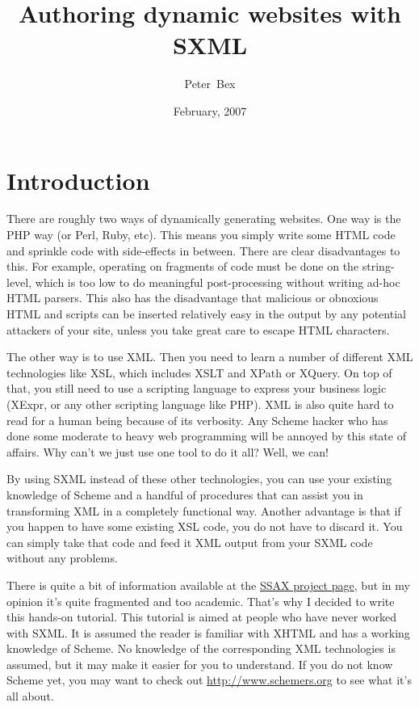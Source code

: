 \documentclass{article}
\date{February, 2007}
\title{Authoring dynamic websites with SXML}
\author{Peter~Bex}
\begin{document}
\maketitle

\section{Introduction}

There are roughly two ways of dynamically generating websites.  One
way is the PHP way (or Perl, Ruby, etc).  This means you simply write
some HTML code and sprinkle code with side-effects in between.  There
are clear disadvantages to this.  For example, operating on fragments
of code must be done on the string-level, which is too low to do
meaningful post-processing without writing ad-hoc HTML parsers.  This
also has the disadvantage that malicious or obnoxious HTML and scripts
can be inserted relatively easy in the output by any potential
attackers of your site, unless you take great care to escape HTML
characters.

The other way is to use XML.  Then you need to learn a number of
different XML technologies like XSL, which includes XSLT and XPath or
XQuery.  On top of that, you still need to use a scripting language to
express your business logic (XExpr, or any other scripting language
like PHP).  XML is also quite hard to read for a human being because
of its verbosity.  Any Scheme hacker who has done some moderate to
heavy web programming will be annoyed by this state of affairs.  Why
can't we just use one tool to do it all?  Well, we can!

By using SXML instead of these other technologies, you can use your
existing knowledge of Scheme and a handful of procedures that can
assist you in transforming XML in a completely functional way.
Another advantage is that if you happen to have some existing XSL
code, you do not have to discard it.  You can simply take that code
and feed it XML output from your SXML code without any problems.

There is quite a bit of information available at the
\href{http://ssax.sourceforge.net}{SSAX project page}, but in my
opinion it's quite fragmented and too academic.  That's why I decided
to write this hands-on tutorial.  This tutorial is aimed at people who
have never worked with SXML.  It is assumed the reader is familiar
with XHTML and has a working knowledge of Scheme.  No knowledge of the
corresponding XML technologies is assumed, but it may make it easier
for you to understand.  If you do not know Scheme yet, you may want to
check out \url{http://www.schemers.org} to see what it's all about.
\end{document}
